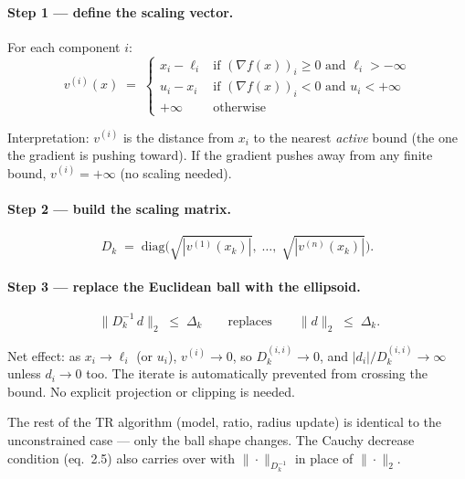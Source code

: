 \documentclass[11pt,a4paper]{article}
\begin{document}
\paragraph{Step 1 --- define the scaling vector.} For each component $i$:
\begin{equation}
\boxed{\;v^{(i)}(x) \;=\;
\begin{cases}
x_i - \ell_i & \text{if } (\nabla f(x))_i \ge 0 \text{ and } \ell_i > -\infty \\[3pt]
u_i - x_i & \text{if } (\nabla f(x))_i < 0 \text{ and } u_i < +\infty \\[3pt]
+\infty & \text{otherwise}
\end{cases}
\;}
\tag{Yuan, eq.\ 3.34--3.35}
\end{equation}

Interpretation: $v^{(i)}$ is the distance from $x_i$ to the nearest \emph{active} bound (the one the gradient is pushing toward). If the gradient pushes away from any finite bound, $v^{(i)} = +\infty$ (no scaling needed).

\paragraph{Step 2 --- build the scaling matrix.}
\begin{equation}
D_k \;=\; \mathrm{diag}\!\Big(\sqrt{|v^{(1)}(x_k)|},\;\ldots,\;\sqrt{|v^{(n)}(x_k)|}\Big).
\tag{Yuan, eq.\ 3.36}
\end{equation}

\paragraph{Step 3 --- replace the Euclidean ball with the ellipsoid.}
\begin{equation}
\boxed{\;\|D_k^{-1}\,d\|_2 \;\le\; \Delta_k\qquad\text{replaces}\qquad \|d\|_2 \;\le\; \Delta_k.}
\tag{Yuan, eq.\ 3.37}
\end{equation}

Net effect: as $x_i \to \ell_i$ (or $u_i$), $v^{(i)} \to 0$, so $D_k^{(i,i)} \to 0$, and $|d_i| / D_k^{(i,i)} \to \infty$ unless $d_i \to 0$ too. The iterate is automatically prevented from crossing the bound. No explicit projection or clipping is needed.

The rest of the TR algorithm (model, ratio, radius update) is identical to the unconstrained case --- only the ball shape changes. The Cauchy decrease condition (eq.\ 2.5) also carries over with $\|\cdot\|_{D_k^{-1}}$ in place of $\|\cdot\|_2$.
\end{document}
